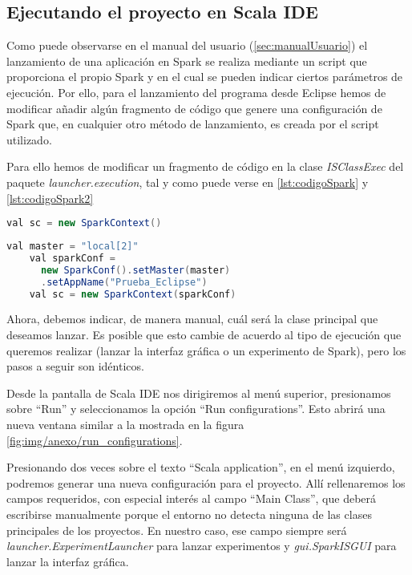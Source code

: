 

\subsection{Ejecutando el proyecto en Scala IDE}

Como puede observarse en el manual del usuario (\ref{sec:manualUsuario}) el lanzamiento de una aplicación en Spark se realiza mediante un script que proporciona el propio Spark y en el cual se pueden indicar ciertos parámetros de ejecución. Por ello, para el lanzamiento del programa desde Eclipse hemos de modificar añadir algún fragmento de código que genere una configuración de Spark que, en cualquier otro método de lanzamiento, es creada por el script utilizado.

Para ello hemos de modificar un fragmento de código en la clase \textit{ISClassExec} del paquete \textit{launcher.execution}, tal y como puede verse en \ref{lst:codigoSpark} y \ref{lst:codigoSpark2}


\begin{lstlisting}[language=Java,tabsize=4,frame = single,caption=Código para la ejecución del programa mediante el script ``spark-sumbit''. ,captionpos=b,label=lst:codigoSpark]
val sc = new SparkContext()
\end{lstlisting}

\begin{lstlisting}[language=Java,tabsize=4,frame = single,caption=Ejemplo de código para la ejecución del programa desde Eclipse. ,captionpos=b,label=lst:codigoSpark2]
	val master = "local[2]"
    val sparkConf =
  	  new SparkConf().setMaster(master)
  	  .setAppName("Prueba_Eclipse")
    val sc = new SparkContext(sparkConf)
\end{lstlisting}

Ahora, debemos indicar, de manera manual, cuál será la clase principal que deseamos lanzar. Es posible que esto cambie de acuerdo al tipo de ejecución que queremos realizar (lanzar la interfaz gráfica o un experimento de Spark), pero los pasos a seguir son idénticos.

Desde la pantalla de Scala IDE nos dirigiremos al menú superior, presionamos sobre ``Run'' y seleccionamos la opción ``Run configurations''. Esto abrirá una nueva ventana similar a la mostrada en la figura \ref{fig:img/anexo/run_configurations}.

Presionando dos veces sobre el texto ``Scala application'', en el menú izquierdo, podremos generar una nueva configuración para el proyecto. Allí rellenaremos los campos requeridos, con especial interés al campo ``Main Class'', que deberá escribirse manualmente porque el entorno no detecta ninguna de las clases principales de los proyectos. En nuestro caso, ese campo siempre será \textit{launcher.ExperimentLauncher} para lanzar experimentos y \textit{gui.SparkISGUI} para lanzar la interfaz gráfica.


